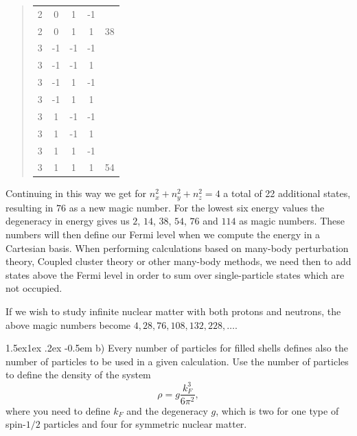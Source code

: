 \documentclass[%
oneside,                 %
final,                   %
10pt]{article}
\makeatletter
\newenvironment{doconceexercise}{}{}
\newcommand\subex{\@startsection{paragraph}{4}{\z@}%
                  {1.5ex\@plus1ex \@minus.2ex}%
                  {-0.5em}%
                  {\normalfont\normalsize\bfseries}}
\makeatother
\begin{document}
\begin{doconceexercise}
\begin{quote}
\begin{tabular}{ccccc}
2                               & 0       & 1       & -1      &                            \\
2                               & 0       & 1       & 1       & 38                         \\
\hline
3                               & -1      & -1      & -1      &                            \\
3                               & -1      & -1      & 1       &                            \\
3                               & -1      & 1       & -1      &                            \\
3                               & -1      & 1       & 1       &                            \\
3                               & 1       & -1      & -1      &                            \\
3                               & 1       & -1      & 1       &                            \\
3                               & 1       & 1       & -1      &                            \\
3                               & 1       & 1       & 1       & 54                         \\
\hline
\end{tabular}
\end{quote}

\noindent
Continuing in this way we get for $n_{x}^{2}+n_{y}^{2}+n_{z}^{2}=4$  a total of 22 additional states, resulting in $76$ as a new magic number. For the lowest six energy values the degeneracy in energy gives us $2$, $14$, $38$, $54$, $76$ and $114$ as magic numbers. These numbers will then define our Fermi level when we compute the energy in a Cartesian basis. When performing calculations based on many-body perturbation theory, Coupled cluster theory or other many-body methods, we need then to add states above the Fermi level in order to sum over single-particle states which are not occupied.  

If we wish to study infinite nuclear matter with both protons and neutrons, the above magic numbers become $4, 28, 76, 108, 132, 228, \dots$.


\subex{b)}
Every number of particles for filled shells defines also the number of particles to be used in a given calculation. Use the number of particles to define  the density of the system 
\[
\rho = g \frac{k_F^3}{6\pi^2},
\]
where you need to define $k_F$ and the degeneracy $g$, which is two for one type of spin-$1/2$ particles and four for symmetric nuclear matter.


\end{doconceexercise}
\end{document}
